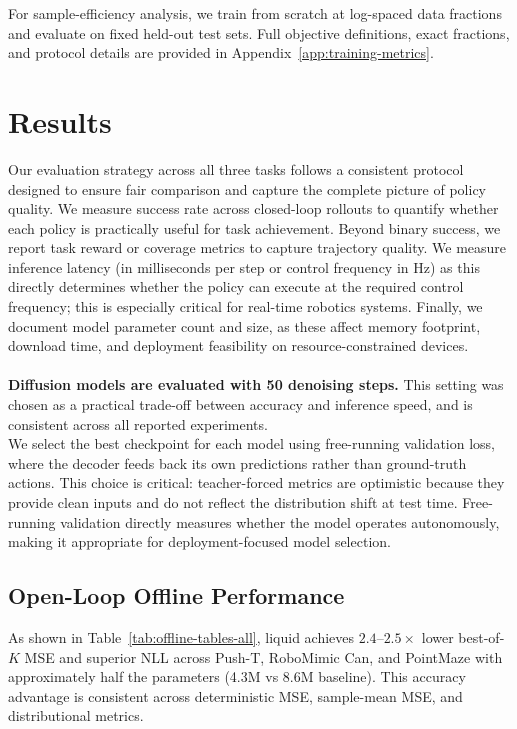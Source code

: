 \documentclass{article}
\begin{document}
For sample-efficiency analysis, we train from scratch at log-spaced data fractions and evaluate on fixed held-out test sets. Full objective definitions, exact fractions, and protocol details are provided in Appendix~\ref{app:training-metrics}.

\section{Results}

Our evaluation strategy across all three tasks follows a consistent protocol designed to ensure fair comparison and capture the complete picture of policy quality. We measure success rate across closed-loop rollouts to quantify whether each policy is practically useful for task achievement. Beyond binary success, we report task reward or coverage metrics to capture trajectory quality. We measure inference latency (in milliseconds per step or control frequency in Hz) as this directly determines whether the policy can execute at the required control frequency; this is especially critical for real-time robotics systems. Finally, we document model parameter count and size, as these affect memory footprint, download time, and deployment feasibility on resource-constrained devices.
\\
\\
\textbf{Diffusion models are evaluated with 50 denoising steps.} This setting was chosen as a practical trade-off between accuracy and inference speed, and is consistent across all reported experiments.\\
We select the best checkpoint for each model using free-running validation loss, where the decoder feeds back its own predictions rather than ground-truth actions. This choice is critical: teacher-forced metrics are optimistic because they provide clean inputs and do not reflect the distribution shift at test time. Free-running validation directly measures whether the model operates autonomously, making it appropriate for deployment-focused model selection.

\subsection{Open-Loop Offline Performance}\label{sec:offline}

As shown in Table~\ref{tab:offline-tables-all}, liquid achieves $2.4$--$2.5\times$ lower best-of-$K$ MSE and superior NLL across Push-T, RoboMimic Can, and PointMaze with approximately half the parameters (4.3M vs 8.6M baseline). This accuracy advantage is consistent across deterministic MSE, sample-mean MSE, and distributional metrics.
\end{document}
